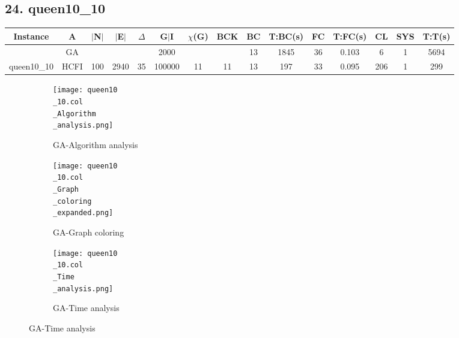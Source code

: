 \documentclass[10pt]{article}
\begin{document}
\subsection*{\hspace{0,9073976cm} 24. queen10\_10}
\begin{table}[H]
\centering
\begin{tabular}{|c|c|c|c|c|c|c|c|c|c|c|c|c|c|c|}
\hline
Instance& A &$|$N$|$ & $|$E$|$ & $\Delta$ & G$|$I & $\chi$(G) &BCK&BC & T:BC(s) & FC & T:FC(s) & CL & SYS & T:T(s) \\ \hline \hline

	&GA&       &                   &                     &     2000    &     \cellcolor{yellow} & {\cellcolor{yellow}}& {{\cellcolor{green}13}}
&1845   &36        & 0.103                   & 6                   & 1         &5694         \\ \cline{2-2} \cline{6-6} \cline{9-15}
 \multirow{-2}{*}{queen10\_10} &HCFI   &\multirow{-2}{*}{100}   &\multirow{-2}{*}{2940}     &\multirow{-2}{*}{35}     &100000     &\multirow{-2}{*}{\cellcolor{yellow}11}      & \multirow{-2}{*}{\cellcolor{yellow}11}    &{\cellcolor{green}13}     &197         &33    &0.095         &206    &1     &299       \\ \hline 
\end{tabular}
\end{table}
\graphicspath{{./Core1/Solutions/GA/queen10\_10.col}}
\begin{figure}[H]
\begin{subfigure}{.33\textwidth}
  \centering
  \texttt{[image: queen10\\\_10.col\\\_Algorithm\\\_analysis.png]}
  \caption{GA-Algorithm analysis}
   \label{fig:subfig1}
\end{subfigure}%
\begin{subfigure}{.33\textwidth}
  \centering
  \texttt{[image: queen10\\\_10.col\\\_Graph\\\_coloring\\\_expanded.png]}
  \caption{GA-Graph coloring}
  \label{fig:subfig2}
\end{subfigure}
\begin{subfigure}{.33\textwidth}
  \centering
  \texttt{[image: queen10\\\_10.col\\\_Time\\\_analysis.png]}
  \caption{GA-Time analysis}
  \end{subfigure}
\end{figure}
\end{document}
